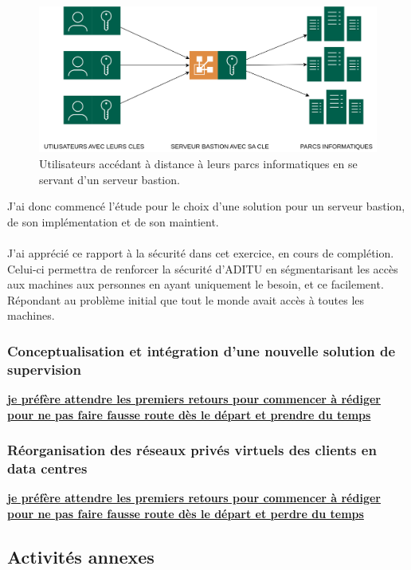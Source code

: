 \begin{sloppypar}
\begin{figure}[H] %
  \centering
  \captionsetup{justification=centering}
  \includegraphics[scale = 0.15]{images/bastion.png}
  \caption{Utilisateurs accédant à distance à leurs parcs informatiques en se servant d'un serveur bastion.}  
  \label{fig:bastion} %
\end{figure}

J'ai donc commencé l'étude pour le choix d'une solution pour un serveur bastion, de son implémentation et de son maintient.
\\ \\
J'ai apprécié ce rapport à la sécurité dans cet exercice, en cours de complétion. Celui-ci permettra de renforcer la sécurité d'ADITU en ségmentarisant les accès aux machines aux personnes en ayant uniquement le besoin, et ce facilement. Répondant au problème initial que tout le monde avait accès à toutes les machines.

\subsubsection{Conceptualisation et intégration d'une nouvelle solution de supervision}

\underline{\textbf{je préfère attendre les premiers retours pour commencer à rédiger}}
\underline{\textbf{pour ne pas faire fausse route dès le départ et prendre du temps}}

\subsubsection{Réorganisation des réseaux privés virtuels des clients en data centres}

\underline{\textbf{je préfère attendre les premiers retours pour commencer à rédiger}}
\underline{\textbf{pour ne pas faire fausse route dès le départ et perdre du temps}}

\subsection{Activités annexes}


\end{sloppypar}
